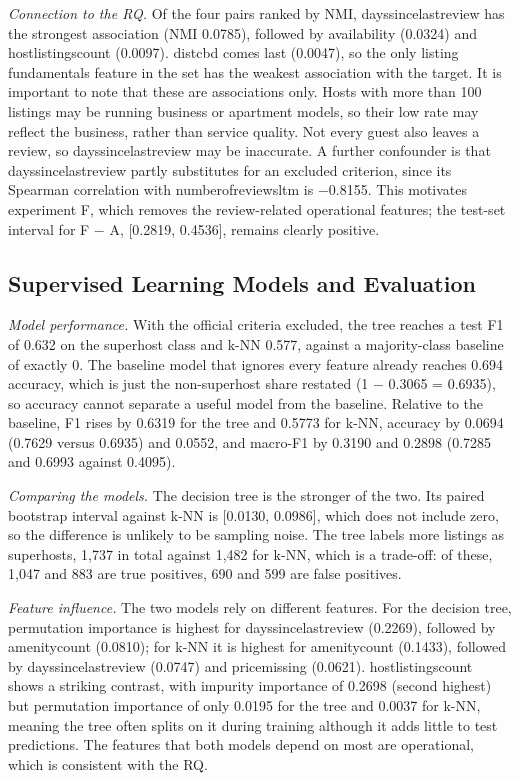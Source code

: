 \documentclass[final,1p,11pt]{elsarticle}
\renewcommand\_{\textunderscore\allowbreak}%
\begin{document}
\textit{Connection to the RQ.} Of the four pairs ranked by NMI, days\_since\_last\_review has the strongest association (NMI 0.0785), followed by availability\_365 (0.0324) and host\_listings\_count (0.0097). dist\_cbd comes last (0.0047), so the only listing fundamentals feature in the set has the weakest association with the target. It is important to note that these are associations only. Hosts with more than 100 listings may be running business or apartment models, so their low rate may reflect the business, rather than service quality. Not every guest also leaves a review, so days\_since\_last\_review may be inaccurate. A further confounder is that days\_since\_last\_review partly substitutes for an excluded criterion, since its Spearman correlation with number\_of\_reviews\_ltm is −0.8155. This motivates experiment F, which removes the review-related operational features; the test-set interval for F − A, [0.2819, 0.4536], remains clearly positive.

\subsection{Supervised Learning Models and Evaluation}

\textit{Model performance.} With the official criteria excluded, the tree reaches a test F1 of 0.632 on the superhost class and k-NN 0.577, against a majority-class baseline of exactly 0. The baseline model that ignores every feature already reaches 0.694 accuracy, which is just the non-superhost share restated (1 − 0.3065 = 0.6935), so accuracy cannot separate a useful model from the baseline. Relative to the baseline, F1 rises by 0.6319 for the tree and 0.5773 for k-NN, accuracy by 0.0694 (0.7629 versus 0.6935) and 0.0552, and macro-F1 by 0.3190 and 0.2898 (0.7285 and 0.6993 against 0.4095).

\textit{Comparing the models.} The decision tree is the stronger of the two. Its paired bootstrap interval against k-NN is [0.0130, 0.0986], which does not include zero, so the difference is unlikely to be sampling noise. The tree labels more listings as superhosts, 1,737 in total against 1,482 for k-NN, which is a trade-off: of these, 1,047 and 883 are true positives, 690 and 599 are false positives.

\textit{Feature influence.} The two models rely on different features. For the decision tree, permutation importance is highest for days\_since\_last\_review (0.2269), followed by amenity\_count (0.0810); for k-NN it is highest for amenity\_count (0.1433), followed by days\_since\_last\_review (0.0747) and price\_missing (0.0621). host\_listings\_count shows a striking contrast, with impurity importance of 0.2698 (second highest) but permutation importance of only 0.0195 for the tree and 0.0037 for k-NN, meaning the tree often splits on it during training although it adds little to test predictions. The features that both models depend on most are operational, which is consistent with the RQ.
\end{document}
